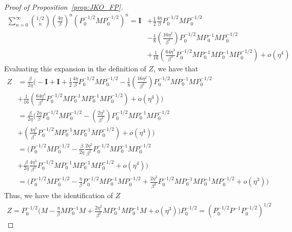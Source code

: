 \documentclass[reqno,11pt,letterpaper]{amsart}
\theoremstyle{plain}
\theoremstyle{definition}
\theoremstyle{remark}
\newcommand{\id}{\mathbf{I}}
\begin{document}
\begin{proof}[Proof of Proposition~\ref{prop:JKO_FP}]
\begin{align*}
    \sum_{n=0}^{\infty}  {{1/2}\choose{n}} \left(\frac{4 \eta}{\beta} \right)^{n} \left( P_{0}^{-1/2} M P_{0}^{-1/2} \right)^{n} = \id & + \frac{1}{2} \frac{4 \eta }{\beta} P_{0}^{-1/2} M P_{0}^{-1/2} \\
    & - \frac{1}{8} \left( \frac{16 \eta^{2}}{\beta^{2}}
    \right) P_{0}^{-1/2} M P_{0}^{-1} M P_{0}^{-1/2} \\
    & + \frac{1}{16} \left( \frac{64 \eta^{3}}{\beta^{3}} P_{0}^{-1/2} M P_{0}^{-1} M P_{0}^{-1} M P_{0}^{-1/2} \right) + o(\eta^{4})
\end{align*}
Evaluating this expansion in the definition of $Z$, we have that
\begin{align*}
   Z &= \frac{\beta}{2 \eta} \biggl( - \id + \id  + \frac{1}{2} \frac{4 \eta }{\beta} P_{0}^{-1/2} M P_{0}^{-1/2}  - \frac{1}{8} \left( \frac{16 \eta^{2}}{\beta^{2}}
    \right) P_{0}^{-1/2} M P_{0}^{-1} M P_{0}^{-1/2} \\
    & + \frac{1}{16} \left( \frac{64 \eta^{3}}{\beta^{3}} P_{0}^{-1/2} M P_{0}^{-1} M P_{0}^{-1} M P_{0}^{-1/2} \right) + o(\eta^{4}) \biggr) \\
    &= \frac{\beta}{2 \eta} \biggl(  \frac{2 \eta }{\beta} P_{0}^{-1/2} M P_{0}^{-1/2}  - \left( \frac{2 \eta^{2}}{\beta^{2}}
    \right) P_{0}^{-1/2} M P_{0}^{-1} M P_{0}^{-1/2} \\
    & + \left( \frac{4 \eta^{3}}{\beta^{3}} P_{0}^{-1/2} M P_{0}^{-1} M P_{0}^{-1} M P_{0}^{-1/2} \right) + o(\eta^{4}) \biggr) \\
    &= \biggl( P_{0}^{-1/2} M P_{0}^{-1/2}  - \frac{\beta}{2 \eta} \frac{2 \eta^{2}}{\beta^{2}}
    P_{0}^{-1/2} M P_{0}^{-1} M P_{0}^{-1/2} \\
    & + \frac{\beta}{2 \eta}  \frac{4 \eta^{3}}{\beta^{3}} P_{0}^{-1/2} M P_{0}^{-1} M P_{0}^{-1} M P_{0}^{-1/2}  + o(\eta^{4}) \biggr) \\
    &= \biggl( P_{0}^{-1/2} M P_{0}^{-1/2}  - \frac{ \eta}{\beta}
    P_{0}^{-1/2} M P_{0}^{-1} M P_{0}^{-1/2} + \frac{2 \eta^{2}}{\beta^{2}} P_{0}^{-1/2} M P_{0}^{-1} M P_{0}^{-1} M P_{0}^{-1/2}  + o(\eta^{3}) \biggr) 
\end{align*}
Thus, we have the identification of $Z$ 
\begin{align*}
    Z = 
    P_{0}^{-1/2}\biggl( M  - \frac{ \eta}{\beta}
    M P_{0}^{-1} M  + \frac{2 \eta^{2}}{\beta^{2}}  M P_{0}^{-1} M P_{0}^{-1} M   + o(\eta^{3}) \biggr)  P_{0}^{-1/2} = \left(
   P_{0}^{-1/2} P^{-1} P_{0}^{-1/2}
   \right)^{1/2}
\end{align*}

\end{proof}
\end{document}
